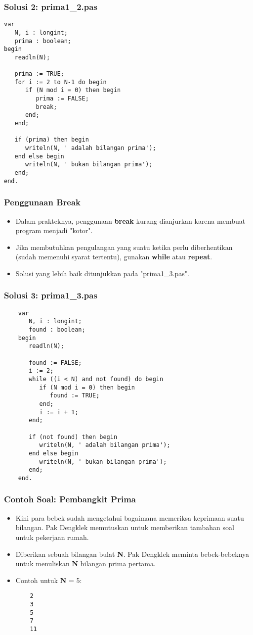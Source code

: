 \documentclass{beamer}
\begin{document}
\begin{frame}[fragile]
\frametitle{Solusi 2: prima1\_2.pas}
\begin{lstlisting}
var
   N, i : longint;
   prima : boolean;
begin
   readln(N);

   prima := TRUE;
   for i := 2 to N-1 do begin
      if (N mod i = 0) then begin
         prima := FALSE;
         break;
      end;
   end;

   if (prima) then begin
      writeln(N, ' adalah bilangan prima');
   end else begin
      writeln(N, ' bukan bilangan prima');
   end;
end.
\end{lstlisting}
\end{frame}

\begin{frame}
\frametitle{Penggunaan Break}
\begin{itemize}
	\item Dalam prakteknya, penggunaan \textbf{break} kurang dianjurkan karena membuat program menjadi "kotor".
	\item Jika membutuhkan pengulangan yang suatu ketika perlu diberhentikan (sudah memenuhi syarat tertentu), gunakan \textbf{while} atau \textbf{repeat}.
	\item Solusi yang lebih baik ditunjukkan pada "prima1\_3.pas".
\end{itemize}
\end{frame}

\begin{frame}[fragile]
\frametitle{Solusi 3: prima1\_3.pas}
\begin{lstlisting}
	var
	   N, i : longint;
	   found : boolean;
	begin
	   readln(N);
	
	   found := FALSE;
	   i := 2;
	   while ((i < N) and not found) do begin
	      if (N mod i = 0) then begin
	         found := TRUE;
	      end;
	      i := i + 1;
	   end;
	
	   if (not found) then begin
	      writeln(N, ' adalah bilangan prima');
	   end else begin
	      writeln(N, ' bukan bilangan prima');
	   end;
	end.
\end{lstlisting}
\end{frame}

\begin{frame}[fragile]
\frametitle{Contoh Soal: Pembangkit Prima}
\begin{itemize}
	\item Kini para bebek sudah mengetahui bagaimana memeriksa keprimaan suatu bilangan. Pak Dengklek memutuskan untuk memberikan tambahan soal untuk pekerjaan rumah.
	\item Diberikan sebuah bilangan bulat \textbf{N}. Pak Dengklek meminta bebek-bebeknya untuk menuliskan \textbf{N} bilangan prima pertama.
	\item Contoh untuk \textbf{N} = 5:
	\begin{lstlisting}
	2
	3
	5
	7
	11
	\end{lstlisting}
\end{itemize}
\end{frame}
\end{document}
